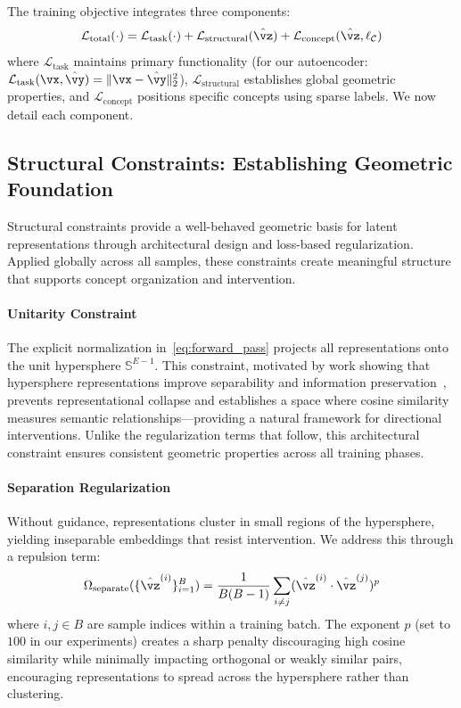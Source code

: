 The training objective integrates three components:
\begin{equation}
    \mathcal{L}_{\text{total}}(\cdot) = \mathcal{L}_{\text{task}}(\cdot) + \mathcal{L}_{\text{structural}}(\hat{\vz}) + \mathcal{L}_{\text{concept}}(\hat{\vz}, \ell_{\mathcal{C}}) \label{eq:total_loss}
\end{equation}
where $\mathcal{L}_{\text{task}}$ maintains primary functionality (for our autoencoder: $\mathcal{L}_{\text{task}}(\vx, \hat{\vy}) = \|\vx - \hat{\vy}\|_2^2$), $\mathcal{L}_{\text{structural}}$ establishes global geometric properties, and $\mathcal{L}_{\text{concept}}$ positions specific concepts using sparse labels. We now detail each component.

%

\subsection{Structural Constraints: Establishing Geometric Foundation}

Structural constraints provide a well-behaved geometric basis for latent representations through architectural design and loss-based regularization. Applied globally across all samples, these constraints create meaningful structure that supports concept organization and intervention.

\paragraph{Unitarity Constraint}
The explicit normalization in~\cref{eq:forward_pass} projects all representations onto the unit hypersphere $\mathbb{S}^{E-1}$. This constraint, motivated by work showing that hypersphere representations improve separability and information preservation~\citep{wang2022understandingcontrastiverepresentationlearning,loshchilov2025ngptnormalizedtransformerrepresentation}, prevents representational collapse and establishes a space where cosine similarity measures semantic relationships---providing a natural framework for directional interventions. Unlike the regularization terms that follow, this architectural constraint ensures consistent geometric properties across all training phases.

\paragraph{Separation Regularization}
Without guidance, representations cluster in small regions of the hypersphere, yielding inseparable embeddings that resist intervention. We address this through a repulsion term:
\begin{align}
    \Omega_{\text{separate}}(\{\hat{\vz}^{(i)}\}_{i=1}^B) = \frac{1}{B(B-1)} \sum_{i \neq j} (\hat{\vz}^{(i)} \cdot \hat{\vz}^{(j)})^{p} \label{eq:separation}
\end{align}
where $i,j \in B$ are sample indices within a training batch. The exponent $p$ (set to $100$ in our experiments) creates a sharp penalty discouraging high cosine similarity while minimally impacting orthogonal or weakly similar pairs, encouraging representations to spread across the hypersphere rather than clustering.

